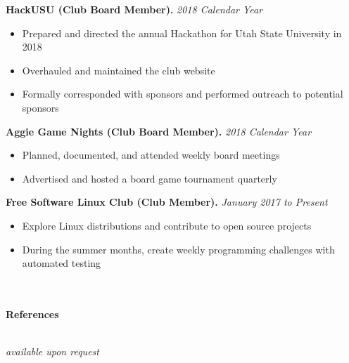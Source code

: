 \documentclass[letterpaper,11pt]{article}
\begin{document}
\textbf{HackUSU (Club Board Member).} \textit{2018 Calendar Year}
\begin{itemize}[noitemsep,topsep=0pt]
	\item Prepared and directed the annual Hackathon for Utah State University in 2018
	\item Overhauled and maintained the club website
	\item Formally corresponded with sponsors and performed outreach to potential sponsors\\
\end{itemize}

\textbf{Aggie Game Nights (Club Board Member).} \textit{2018 Calendar Year}
\begin{itemize}[noitemsep,topsep=0pt]
	\item Planned, documented, and attended weekly board meetings
	\item Advertised and hosted a board game tournament quarterly\\
\end{itemize}

\textbf{Free Software Linux Club (Club Member).} \textit{January 2017 to Present}
\begin{itemize}[noitemsep,topsep=0pt]
	\item Explore Linux distributions and contribute to open source projects
	\item During the summer months, create weekly programming challenges with automated testing\\\\
\end{itemize}



\begin{Large}\textbf{\\References}\end{Large}

\textit{\\available upon request}

\end{document}
